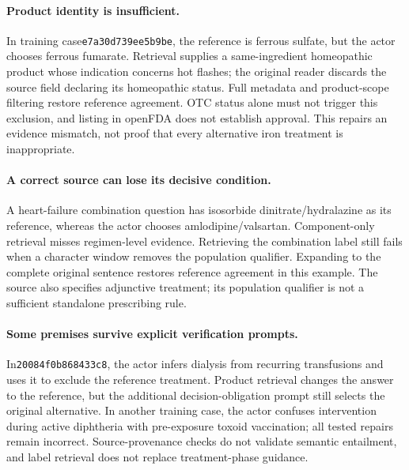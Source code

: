 \paragraph{Product identity is insufficient.}
In training case\texttt{e7a30d739ee5b9be}, the reference is ferrous sulfate, but the actor chooses ferrous fumarate. Retrieval supplies a same-ingredient homeopathic product whose indication concerns hot flashes; the original reader discards the source field declaring its homeopathic status. Full metadata and product-scope filtering restore reference agreement. OTC status alone must not trigger this exclusion, and listing in openFDA does not establish approval. This repairs an evidence mismatch, not proof that every alternative iron treatment is inappropriate.

\paragraph{A correct source can lose its decisive condition.}
A heart-failure combination question has isosorbide dinitrate/hydralazine as its reference, whereas the actor chooses amlodipine/valsartan. Component-only retrieval misses regimen-level evidence. Retrieving the combination label still fails when a character window removes the population qualifier. Expanding to the complete original sentence restores reference agreement in this example. The source also specifies adjunctive treatment; its population qualifier is not a sufficient standalone prescribing rule.

\paragraph{Some premises survive explicit verification prompts.}
In\texttt{20084f0b868433c8}, the actor infers dialysis from recurring transfusions and uses it to exclude the reference treatment. Product retrieval changes the answer to the reference, but the additional decision-obligation prompt still selects the original alternative. In another training case, the actor confuses intervention during active diphtheria with pre-exposure toxoid vaccination; all tested repairs remain incorrect. Source-provenance checks do not validate semantic entailment, and label retrieval does not replace treatment-phase guidance.

